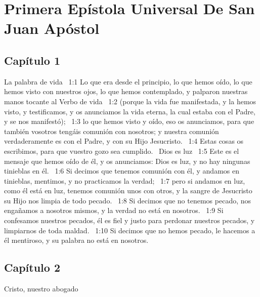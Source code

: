 \chapter{Primera Epístola Universal De San Juan Apóstol}


\section*{Capítulo 1}
La palabra de vida  
1:1 Lo que era desde el principio, lo que hemos oído, lo que hemos visto con nuestros ojos, lo que hemos contemplado, y palparon nuestras manos tocante al Verbo de vida  
1:2 (porque la vida fue manifestada, y la hemos visto, y testificamos, y os anunciamos la vida eterna, la cual estaba con el Padre, y se nos manifestó);  
1:3 lo que hemos visto y oído, eso os anunciamos, para que también vosotros tengáis comunión con nosotros; y nuestra comunión verdaderamente es con el Padre, y con su Hijo Jesucristo.  
1:4 Estas cosas os escribimos, para que vuestro gozo sea cumplido.  
Dios es luz  
1:5 Este es el mensaje que hemos oído de él, y os anunciamos: Dios es luz, y no hay ningunas tinieblas en él.  
1:6 Si decimos que tenemos comunión con él, y andamos en tinieblas, mentimos, y no practicamos la verdad;  
1:7 pero si andamos en luz, como él está en luz, tenemos comunión unos con otros, y la sangre de Jesucristo su Hijo nos limpia de todo pecado.  
1:8 Si decimos que no tenemos pecado, nos engañamos a nosotros mismos, y la verdad no está en nosotros.  
1:9 Si confesamos nuestros pecados, él es fiel y justo para perdonar nuestros pecados, y limpiarnos de toda maldad.  
1:10 Si decimos que no hemos pecado, le hacemos a él mentiroso, y su palabra no está en nosotros.  
\section*{Capítulo 2}
Cristo, nuestro abogado  

